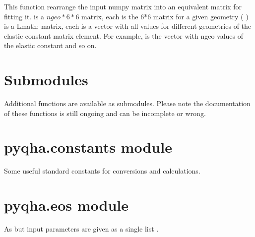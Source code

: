 \documentclass[letterpaper,10pt,english]{sphinxmanual}
\begin{document}

\begin{fulllineitems}
\label{pyqha:pyqha.fitC.rearrange_Cx}
This function rearrange the input numpy matrix  into an equivalent matrix 
for fitting it.
 is a \(ngeo*6*6\) matrix, each  is the 6*6  matrix for a given geometry (  )
 is a Lmath: matrix, each  is a vector with all values for different
geometries of the  elastic constant matrix element. For example, 
is the vector with ngeo values of the  elastic constant and so on.

\end{fulllineitems}



\section{Submodules}
\label{pyqha:submodules}
Additional functions are available as submodules. Please note the documentation of these functions is still ongoing and can be incomplete or wrong.


\section{pyqha.constants module}
\label{pyqha:pyqha-constants-module}\label{pyqha:module-pyqha.constants}
Some useful standard constants for conversions and calculations.


\section{pyqha.eos module}
\label{pyqha:pyqha-eos-module}\label{pyqha:module-pyqha.eos}

\begin{fulllineitems}
\label{pyqha:pyqha.eos.E_Murn}
As {\hyperref[pyqha:pyqha.eos.E_MurnV]{}} but input parameters are given as a single list 
.

\end{fulllineitems}
\end{document}
